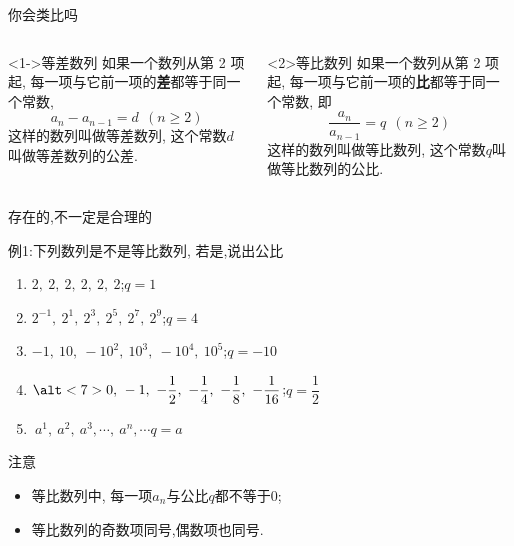 \documentclass[mathserif,blue]{beamer}
\newcommand\colorwordsa[1]{\textcolor[rgb]{0,.63,.91}{\small\heiti #1}}%
\begin{document}
\begin{frame}{你会类比吗}
\kaishu
  \begin{columns}
  \begin{column}{0.5\textwidth}
    \begin{block}<1->{等差数列}
      如果一个数列\an 从第 2 项起, 每一项与它前一项的\textbf{差}都等于同一个常数, $$a_{n}-a_{n-1}=d~~(n\geqslant2)$$ 这样的数列叫做\colorwordsa{等差数列}, 这个常数$d$ 叫做等差数列的\colorwordsa{公差}.
    \end{block}
  \end{column}
  \begin{column}{0.5\textwidth}
    \begin{block}<2>{等比数列}
      如果一个数列\an 从第 2 项起, 每一项与它前一项的\textbf{比}都等于同一个常数, 即$$\frac{a_{n}}{a_{n-1}}=q~~(n\geqslant2)$$这样的数列叫做\colorwordsa{等比数列}, 这个常数$q$叫做等比数列的\colorwordsa{公比}.
    \end{block}
  \end{column}
  \end{columns}
\end{frame}


\begin{frame}{存在的,不一定是合理的}
  \begin{exampleblock}{例1:下列数列是不是等比数列, 若是,说出公比}
  \begin{enumerate}
    \item $2,~2,~2,~2,~2,~2$;\pause\hspace*{\fill}$q=1$\hspace*{.5in}\pause
    \item $2^{-1},~2^1,~2^3,~2^5,~2^7,~2^9$;\pause\hspace*{\fill}$q=4$\hspace*{.5in}\pause
    \item $-1,~10,~-10^2,~10^3,~-10^4,~10^5$;\vspace{1ex}\pause\hspace*{\fill}$q=-10$\hspace*{.5in}\pause
    \item $\alt<7>{0,~}{}-1,~-\dfrac12,~-\dfrac14,~-\dfrac18,~-\dfrac1{16}$;\vspace{1ex}\pause\pause\hspace*{\fill}$ q=\dfrac12$\hspace*{.5in}\pause
    \item $~a^1,~a^2,~a^3,\cdots,~a^n,\cdots$\pause\pause\hspace*{\fill}$q=a$\hspace*{.5in}\pause
  \end{enumerate}
  \end{exampleblock}
  \begin{alertblock}{注意}\pause
    \begin{itemize}[<+->]
       \item 等比数列\an 中, 每一项$a_n$与公比$q$都不等于\alert{$0$};
       \item 等比数列的奇数项同号,偶数项也同号.
     \end{itemize}
  \end{alertblock}
\end{frame}
\end{document}
